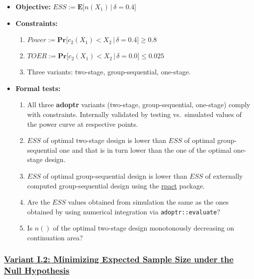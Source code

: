 \documentclass[]{book}
\providecommand{\tightlist}{%
  \setlength{\itemsep}{0pt}\setlength{\parskip}{0pt}}
\begin{document}
\begin{itemize}
\tightlist
\item
  \textbf{Objective:} \(ESS := \boldsymbol{E}\big[n(X_1)\,|\,\delta=0.4\big]\)
\item
  \textbf{Constraints:}

  \begin{enumerate}
  \def\labelenumi{\arabic{enumi}.}
  \tightlist
  \item
    \(Power := \boldsymbol{Pr}\big[c_2(X_1) < X_2\,|\,\delta=0.4\big] \geq 0.8\)
  \item
    \(TOER := \boldsymbol{Pr}\big[c_2(X_1) < X_2\,|\,\delta=0.0\big] \leq 0.025\)
  \item
    Three variants: two-stage, group-sequential, one-stage.
  \end{enumerate}
\item
  \textbf{Formal tests:}

  \begin{enumerate}
  \def\labelenumi{\arabic{enumi}.}
  \tightlist
  \item
    All three \textbf{adoptr} variants (two-stage, group-sequential, one-stage)
    comply with constraints. Internally validated by testing vs.~simulated
    values of the power curve at respective points.
  \item
    \(ESS\) of optimal two-stage design is lower than \(ESS\) of optimal
    group-sequential one and that is in turn lower than the one of the
    optimal one-stage design.
  \item
    \(ESS\) of optimal group-sequential design is lower than \(ESS\) of
    externally computed group-sequential design using the \href{https://rpact.org/}{rpact} package.
  \item
    Are the \(ESS\) values obtained from simulation the same as the ones
    obtained by using numerical integration via \texttt{adoptr::evaluate}?
  \item
    Is \(n()\) of the optimal two-stage design monotonously decreasing on
    continuation area?
  \end{enumerate}
\end{itemize}

\hypertarget{variant-i.2-minimizing-expected-sample-size-under-the-null-hypothesis}{%
\subsubsection{\texorpdfstring{\protect\hyperlink{variantI_2}{Variant I.2: Minimizing Expected Sample Size under the Null Hypothesis}}{Variant I.2: Minimizing Expected Sample Size under the Null Hypothesis}}\label{variant-i.2-minimizing-expected-sample-size-under-the-null-hypothesis}}
\end{document}
